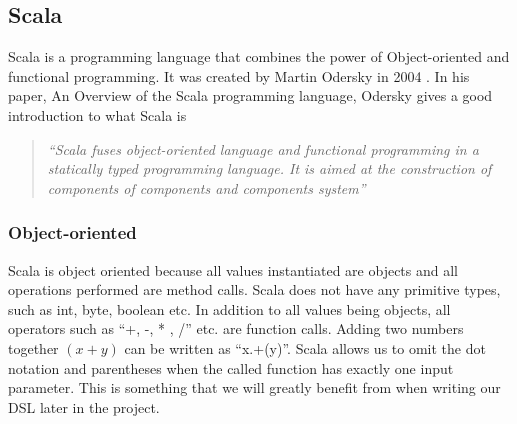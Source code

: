 \subsection{Scala}
\label{sec:scala}
Scala is a programming language that combines the power of Object-oriented and functional programming. It was created by Martin Odersky in 2004 \cite{odersky2004overview}. In his paper, An Overview of the Scala programming language, Odersky gives a good introduction to what Scala is 
\begin{quote}
	\textit{``Scala fuses object-oriented language and functional programming in a statically typed programming language. It is aimed at the construction of components of components and components system''}
	\begin{flushright}
		\cite{odersky2004overview}
	\end{flushright}		
\end{quote}

\subsubsection{Object-oriented}
Scala is object oriented because all values instantiated are objects and all operations performed are method calls. Scala does not have any primitive types, such as int, byte, boolean etc. In addition to all values being objects, all operators such as ``+, -, * , /'' etc. are function calls. Adding two numbers together $(x + y)$ can be written as ``x.+(y)''. Scala allows us to omit the dot notation and parentheses when the called function has exactly one input parameter. This is something that we will greatly benefit from when writing our DSL later in the project.

